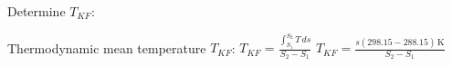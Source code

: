 Determine \( T_{KF} \):  

Thermodynamic mean temperature \( T_{KF} \):  
\( T_{KF} = \frac{\int_{S_1}^{S_2} T \, ds}{S_2 - S_1} \)  
\( T_{KF} = \frac{s(298.15 - 288.15) \, \text{K}}{S_2 - S_1} \)